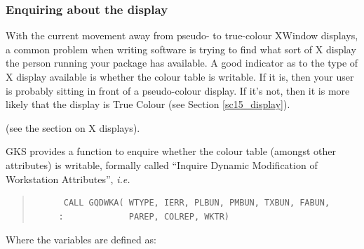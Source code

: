 \documentclass[twoside,11pt]{article}
\newcommand{\htmlref}[2]{#1}
\newcommand{\latex}[1]{#1}
\newcommand{\xref}[3]{#1}
\begin{document}


\subsubsection{Enquiring about the display}

With the current movement away from pseudo- to true-colour XWindow
displays, a common problem when writing software is trying to find
what sort of X display the person running your package has available.
A good indicator as to the type of X display available is whether the
colour table is writable. If it is, then your user is probably sitting
in front of a pseudo-colour display. If it's not, then it is more
likely that the display is True Colour \latex{ (see Section
\ref{sc15_display}).} 
\begin{htmlonly} 
(see the section on \htmlref{X displays}{sc15_display}). 
\end{htmlonly}

GKS provides a function to enquire whether the colour table (amongst
other attributes) is writable, formally called ``Inquire Dynamic
Modification of Workstation Attributes'', {\em i.e.\ }

\small
\begin{quote}
\begin{verbatim}
      CALL GQDWKA( WTYPE, IERR, PLBUN, PMBUN, TXBUN, FABUN,
     :             PAREP, COLREP, WKTR)
\end{verbatim}
\end{quote}
\normalsize

Where the variables are defined as:
\end{document}
